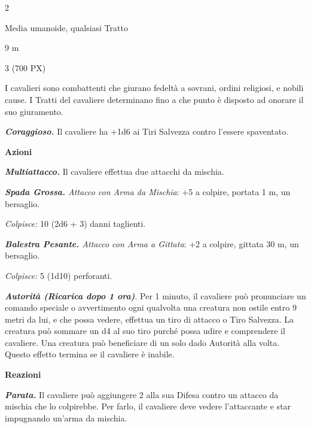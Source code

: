 \begin{multicols}{2}
{
\begin{description}[noitemsep, topsep=0pt, parsep=0pt, partopsep=0pt, itemsep=1pt, leftmargin=2.35cm,  labelwidth=2.2cm, itemindent=0cm, listparindent=0pt] %
\setlength{\baselineskip}{10pt}
\item[\textbf{Taglia/Tipo}] Media umanoide, qualsiasi Tratto
\item[\textbf{Caratt.}] 
\item[\textbf{Punti Ferita}] 
\item[\textbf{Tiri Salvez.}] 
\item[\textbf{Movimento}] 9 m
\item[\textbf{Sfida}] 3 (700 PX)
\end{description}
\smallskip

I cavalieri sono combattenti che giurano fedeltà a sovrani, ordini religiosi, e nobili cause. I Tratti del cavaliere determinano fino a che punto è disposto ad onorare il suo giuramento.

\emph{\textbf{Coraggioso.}} Il cavaliere ha +1d6 ai Tiri Salvezza contro l'essere spaventato.

\textbf{Azioni}

\emph{\textbf{Multiattacco.}} Il cavaliere effettua due attacchi da mischia.

\emph{\textbf{Spada Grossa.} Attacco con Arma da Mischia}: +5 a colpire, portata 1 m, un bersaglio.

\emph{Colpisce:} 10 (2d6 + 3) danni taglienti.

\emph{\textbf{Balestra Pesante.} Attacco con Arma a Gittata}: +2 a colpire, gittata 30 m, un bersaglio.

\emph{Colpisce:} 5 (1d10) perforanti.

\emph{\textbf{Autorità (Ricarica dopo 1 ora)}}. Per 1 minuto, il cavaliere può pronunciare un comando speciale o avvertimento ogni qualvolta una creatura non ostile entro 9 metri da lui, e che possa vedere, effettua un tiro di attacco o Tiro Salvezza. La creatura può sommare un d4 al suo tiro purché possa udire e comprendere il cavaliere. Una creatura può beneficiare di un solo dado Autorità alla volta. Questo effetto termina se il cavaliere è inabile.

\textbf{Reazioni}

\emph{\textbf{Parata.}} Il cavaliere può aggiungere 2 alla sua Difesa contro un attacco da mischia che lo colpirebbe. Per farlo, il cavaliere deve vedere l'attaccante e star impugnando un'arma da mischia.

}
\end{multicols}
